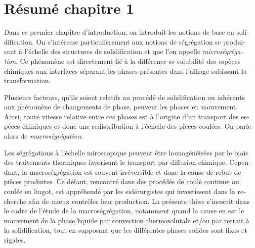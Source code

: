 \clearpage
\section*{Résumé chapitre 1}

\begin{otherlanguage}{french}
{\small

Dans ce premier chapitre d'introduction, on introduit les notions de base en solidification. 
On s'intéresse particulièrement aux notions de ségrégation se produisant à l'échelle des structures 
de solidification et que l'on appelle \emph{microségrégation}. Ce phénomène est directement lié à la 
différence se solubilité des espèces chimiques aux interfaces séparant les phases présentes dans 
l'alliage subissant la transformation.


Plusieurs facteurs, qu'ils soient relatifs au procédé de solidification ou inhérents aux phénomène de changements de phase,
peuvent les phases en mouvement. Ainsi, toute vitesse relative entre ces phases est à l'origine d'un transport des espèces chimiques
et donc une redistribution à l'échelle des pièces coulées. On parle alors de \emph{macroségrégation}.


Les ségrégations à l'échelle miroscopique peuvent être homogénéisées par le biais 
des traitements thermiques favorisant le transport par diffusion chimique.
Cependant, la macroségrégation est souvent irréversible et donc la cause de rebut de pièces produites. 
Ce défaut, rencontré dans des procédés de coulé continue ou coulée en lingot, est appréhendé par les
sidérurgistes qui investissent dans la recherche afin de mieux contrôler leur production.
La présente thèse s'incscrit dans le cadre de l'étude de la macroségrégation, notamment quand la cause en est
le mouvement de la phase liquide par convection thermosolutale et/ou par retrait à la solidification, tout en supposant
que les différentes phases solides sont fixes et rigides.


}
\end{otherlanguage}
